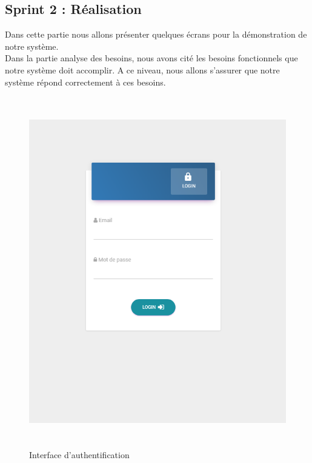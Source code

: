 \documentclass{article}
\begin{document}
\subsection{Sprint 2 : Réalisation }
Dans cette partie nous allons présenter quelques écrans pour la démonstration de
notre système.\\
Dans la partie analyse des besoins, nous avons cité les besoins fonctionnels que notre
système doit accomplir. A ce niveau, nous allons s'assurer que notre système répond
correctement à ces besoins.
\begin{figure}[H]
\centering
\vspace*{0.8in}
\includegraphics[height=6in]{authen.PNG}
\caption[Figure16 : Interface d'authentification]{Interface d'authentification}
\label{fig:pic8}
\end{figure}
\end{document}
